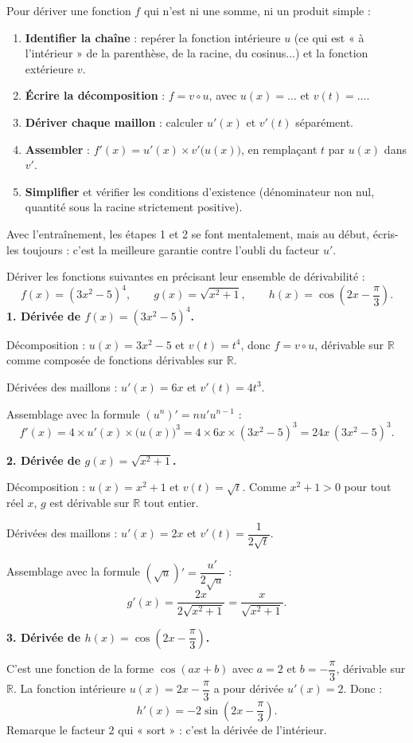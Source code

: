 \documentclass[11pt]{article}
\begin{document}
\begin{methode}
Pour dériver une fonction $f$ qui n'est ni une somme, ni un produit simple :
\begin{enumerate}
\item \textbf{Identifier la chaîne} : repérer la fonction intérieure $u$ (ce qui est « à l'intérieur » de la parenthèse, de la racine, du cosinus...) et la fonction extérieure $v$.
\item \textbf{Écrire la décomposition} : $f = v \circ u$, avec $u(x) = \ldots$ et $v(t) = \ldots$.
\item \textbf{Dériver chaque maillon} : calculer $u'(x)$ et $v'(t)$ séparément.
\item \textbf{Assembler} : $f'(x) = u'(x) \times v'\big(u(x)\big)$, en remplaçant $t$ par $u(x)$ dans $v'$.
\item \textbf{Simplifier} et vérifier les conditions d'existence (dénominateur non nul, quantité sous la racine strictement positive).
\end{enumerate}
Avec l'entraînement, les étapes 1 et 2 se font mentalement, mais au début, écris-les toujours : c'est la meilleure garantie contre l'oubli du facteur $u'$.
\end{methode}

\begin{exoresolu}
Dériver les fonctions suivantes en précisant leur ensemble de dérivabilité :
\[ f(x) = (3x^2 - 5)^4, \qquad g(x) = \sqrt{x^2 + 1}, \qquad h(x) = \cos\left(2x - \frac{\pi}{3}\right). \]
\tcblower
\textbf{1. Dérivée de $f(x) = (3x^2 - 5)^4$.}

Décomposition : $u(x) = 3x^2 - 5$ et $v(t) = t^4$, donc $f = v \circ u$, dérivable sur $\mathbb{R}$ comme composée de fonctions dérivables sur $\mathbb{R}$.

Dérivées des maillons : $u'(x) = 6x$ et $v'(t) = 4t^3$.

Assemblage avec la formule $\left(u^n\right)' = n u' u^{n-1}$ :
\[ f'(x) = 4 \times u'(x) \times \big(u(x)\big)^3 = 4 \times 6x \times (3x^2 - 5)^3 = 24x\,(3x^2 - 5)^3. \]

\textbf{2. Dérivée de $g(x) = \sqrt{x^2 + 1}$.}

Décomposition : $u(x) = x^2 + 1$ et $v(t) = \sqrt{t}$. Comme $x^2 + 1 > 0$ pour tout réel $x$, $g$ est dérivable sur $\mathbb{R}$ tout entier.

Dérivées des maillons : $u'(x) = 2x$ et $v'(t) = \dfrac{1}{2\sqrt{t}}$.

Assemblage avec la formule $\left(\sqrt{u}\right)' = \dfrac{u'}{2\sqrt{u}}$ :
\[ g'(x) = \frac{2x}{2\sqrt{x^2 + 1}} = \frac{x}{\sqrt{x^2 + 1}}. \]

\textbf{3. Dérivée de $h(x) = \cos\left(2x - \dfrac{\pi}{3}\right)$.}

C'est une fonction de la forme $\cos(ax + b)$ avec $a = 2$ et $b = -\dfrac{\pi}{3}$, dérivable sur $\mathbb{R}$. La fonction intérieure $u(x) = 2x - \dfrac{\pi}{3}$ a pour dérivée $u'(x) = 2$. Donc :
\[ h'(x) = -2\sin\left(2x - \frac{\pi}{3}\right). \]
Remarque le facteur $2$ qui « sort » : c'est la dérivée de l'intérieur.
\end{exoresolu}
\end{document}
